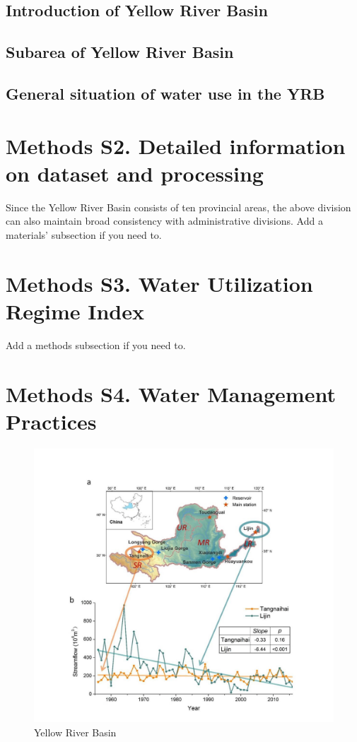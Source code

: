 \documentclass[9pt,twoside,lineno]{pnas-new}
\begin{document}
\subsection*{Introduction of Yellow River Basin}
\subsection*{Subarea of Yellow River Basin}
\subsection*{General situation of water use in the YRB}

\section*{Methods S2. Detailed information on dataset and processing}
Since the Yellow River Basin consists of ten provincial areas, the above division can also maintain broad consistency with administrative divisions.
Add a materials' subsection if you need to.

\section*{Methods S3. Water Utilization Regime Index}
Add a methods subsection if you need to.

\section{Methods S4. Water Management Practices}

\begin{figure}
    \centering
    \includegraphics[width=\textwidth]{../../figures/supplementary_information/YRB.jpg}
    \caption{Yellow River Basin}
\end{figure}
\end{document}
